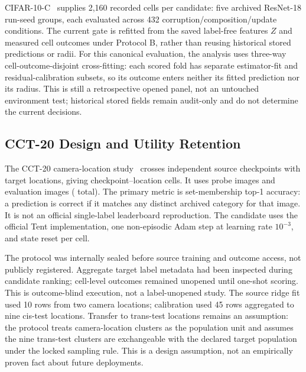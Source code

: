 CIFAR-10-C~\cite{hendrycks2019cifar10c} supplies 2,160 recorded cells per candidate: five
archived ResNet-18 run-seed groups, each evaluated across 432
corruption/composition/update conditions. The current gate is refitted from the saved label-free
features $Z$ and measured cell outcomes under Protocol B, rather than reusing historical stored
predictions or radii. For this canonical evaluation, the analysis uses three-way
cell-outcome-disjoint cross-fitting: each scored fold has separate estimator-fit and
residual-calibration subsets, so its outcome enters neither its fitted prediction nor its radius.
This is still a retrospective opened panel, not an untouched environment test; historical stored
fields remain audit-only and do not determine the current decisions.

\subsection{CCT-20 Design and Utility Retention}
\label{sec:cct20-design}

The CCT-20 camera-location study~\cite{beery2018recognition} crosses
\CCTCheckpointCount{} independent source checkpoints with \CCTLocationCount{} target locations,
giving \CCTCellCount{} checkpoint--location cells. It uses
\CCTProbeImageCount{} probe images and \CCTEvaluationImageCount{} evaluation images
(\CCTTargetImageCount{} total). The primary metric is set-membership top-1 accuracy: a prediction
is correct if it matches any distinct archived category for that image.
It is not an official single-label leaderboard reproduction. The candidate uses the official Tent
implementation, one non-episodic Adam step at learning rate $10^{-3}$, and state reset per cell.

The protocol was internally sealed before source training and outcome access, not publicly
registered. Aggregate target label metadata had been inspected during candidate ranking; cell-level
outcomes remained unopened until one-shot scoring. This is outcome-blind execution, not a
label-unopened study. The source ridge fit used 10 rows from two camera locations; calibration used
45 rows aggregated to nine cis-test locations. Transfer to trans-test locations remains an assumption:
the protocol treats camera-location clusters as the population unit and assumes the nine trans-test
clusters are exchangeable with the declared target population under the locked sampling rule. This
is a design assumption, not an empirically proven fact about future deployments.


